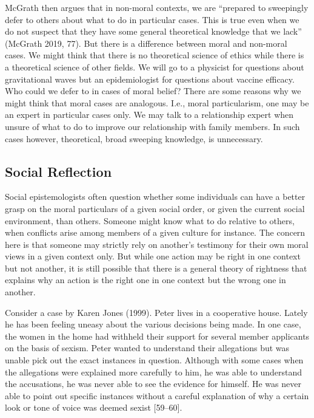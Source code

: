 \documentclass[
  letterpaper,
  DIV=11,
  numbers=noendperiod]{scrartcl}
\theoremstyle{remark}
\begin{document}
McGrath then argues that in non-moral contexts, we are ``prepared to
sweepingly defer to others about what to do in particular cases. This is
true even when we do not suspect that they have some general theoretical
knowledge that we lack'' (McGrath 2019, 77). But there is a difference
between moral and non-moral cases. We might think that there is no
theoretical science of ethics while there is a theoretical science of
other fields. We will go to a physicist for questions about
gravitational waves but an epidemiologist for questions about vaccine
efficacy. Who could we defer to in cases of moral belief? There are some
reasons why we might think that moral cases are analogous. I.e., moral
particularism, one may be an expert in particular cases only. We may
talk to a relationship expert when unsure of what to do to improve our
relationship with family members. In such cases however, theoretical,
broad sweeping knowledge, is unnecessary.

\subsection{Social Reflection}\label{social-reflection}

Social epistemologists often question whether some individuals can have
a better grasp on the moral particulars of a given social order, or
given the current social environment, than others. Someone might know
what to do relative to others, when conflicts arise among members of a
given culture for instance. The concern here is that someone may
strictly rely on another's testimony for their own moral views in a
given context only. But while one action may be right in one context but
not another, it is still possible that there is a general theory of
rightness that explains why an action is the right one in one context
but the wrong one in another.

Consider a case by Karen Jones (1999). Peter lives in a cooperative
house. Lately he has been feeling uneasy about the various decisions
being made. In one case, the women in the home had withheld their
support for several member applicants on the basis of sexism. Peter
wanted to understand their allegations but was unable pick out the exact
instances in question. Although with some cases when the allegations
were explained more carefully to him, he was able to understand the
accusations, he was never able to see the evidence for himself. He was
never able to point out specific instances without a careful explanation
of why a certain look or tone of voice was deemed sexist {[}59--60{]}.
\end{document}
